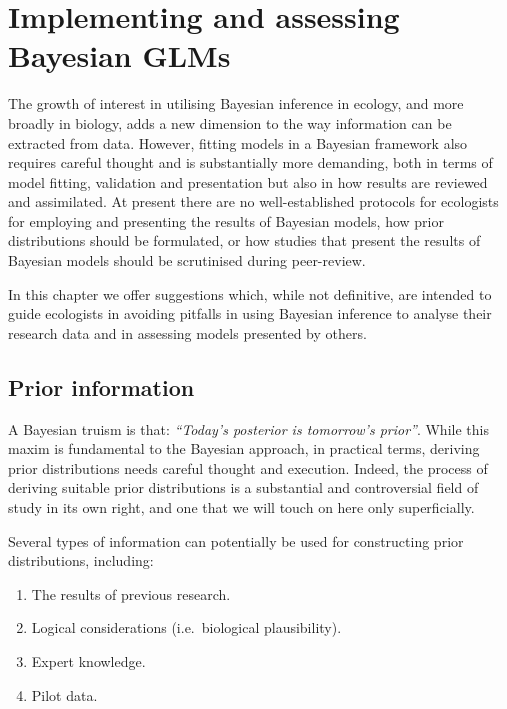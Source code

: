 \documentclass[
]{book}
\begin{document}
\hypertarget{implementing-and-assessing-bayesian-glms}{%
\chapter{Implementing and assessing Bayesian GLMs}\label{implementing-and-assessing-bayesian-glms}}

The growth of interest in utilising Bayesian inference in ecology, and more broadly in biology, adds a new dimension to the way information can be extracted from data. However, fitting models in a Bayesian framework also requires careful thought and is substantially more demanding, both in terms of model fitting, validation and presentation but also in how results are reviewed and assimilated. At present there are no well-established protocols for ecologists for employing and presenting the results of Bayesian models, how prior distributions should be formulated, or how studies that present the results of Bayesian models should be scrutinised during peer-review.

In this chapter we offer suggestions which, while not definitive, are intended to guide ecologists in avoiding pitfalls in using Bayesian inference to analyse their research data and in assessing models presented by others.

\hypertarget{prior-information}{%
\section{Prior information}\label{prior-information}}

A Bayesian truism is that: \emph{``Today's posterior is tomorrow's prior''}. While this maxim is fundamental to the Bayesian approach, in practical terms, deriving prior distributions needs careful thought and execution. Indeed, the process of deriving suitable prior distributions is a substantial and controversial field of study in its own right, and one that we will touch on here only superficially.

Several types of information can potentially be used for constructing prior distributions, including:

\begin{enumerate}
\def\labelenumi{\arabic{enumi}.}
\item
  The results of previous research.
\item
  Logical considerations (i.e.~biological plausibility).
\item
  Expert knowledge.
\item
  Pilot data.
\end{enumerate}
\end{document}
